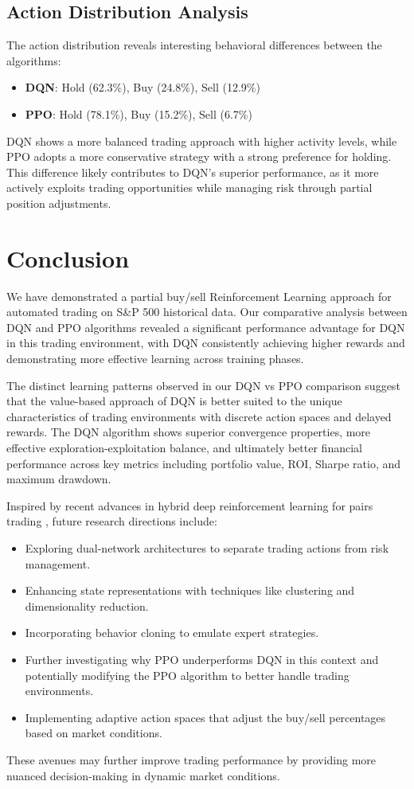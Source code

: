 \documentclass[11pt]{article}
\begin{document}
\subsection{Action Distribution Analysis}
The action distribution reveals interesting behavioral differences between the algorithms:

\begin{itemize}
  \item \textbf{DQN}: Hold (62.3\%), Buy (24.8\%), Sell (12.9\%)
  \item \textbf{PPO}: Hold (78.1\%), Buy (15.2\%), Sell (6.7\%)
\end{itemize}

DQN shows a more balanced trading approach with higher activity levels, while PPO adopts a more conservative strategy with a strong preference for holding. This difference likely contributes to DQN's superior performance, as it more actively exploits trading opportunities while managing risk through partial position adjustments.

\section{Conclusion}
We have demonstrated a partial buy/sell Reinforcement Learning approach for automated trading on S\&P 500 historical data. Our comparative analysis between DQN and PPO algorithms revealed a significant performance advantage for DQN in this trading environment, with DQN consistently achieving higher rewards and demonstrating more effective learning across training phases.

The distinct learning patterns observed in our DQN vs PPO comparison suggest that the value-based approach of DQN is better suited to the unique characteristics of trading environments with discrete action spaces and delayed rewards. The DQN algorithm shows superior convergence properties, more effective exploration-exploitation balance, and ultimately better financial performance across key metrics including portfolio value, ROI, Sharpe ratio, and maximum drawdown.

Inspired by recent advances in hybrid deep reinforcement learning for pairs trading \citep{kim2022hybrid}, future research directions include:
\begin{itemize}
  \item Exploring dual-network architectures to separate trading actions from risk management.
  \item Enhancing state representations with techniques like clustering and dimensionality reduction.
  \item Incorporating behavior cloning to emulate expert strategies.
  \item Further investigating why PPO underperforms DQN in this context and potentially modifying the PPO algorithm to better handle trading environments.
  \item Implementing adaptive action spaces that adjust the buy/sell percentages based on market conditions.
\end{itemize}

These avenues may further improve trading performance by providing more nuanced decision-making in dynamic market conditions.



\end{document}
